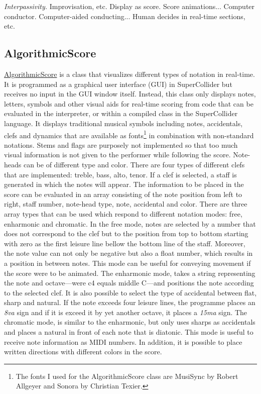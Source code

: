 \emph{Interpassivity.} Improvisation, etc.
Display as score. Score animations...
Computer conductor.
Computer-aided conducting... Human decides in real-time sections, etc.

\subsection{AlgorithmicScore}

\href{http://github.com/freuben/FedeLib/blob/master/AlgorithmicScore/AlgorithmicScore.sc}{AlgorithmicScore} is a class that visualizes different types of notation in real-time. It is programmed as a graphical user interface (GUI) in SuperCollider but receives no input in the GUI window itself. Instead, this class only displays notes, letters, symbols and other visual aids for real-time scoring from code that can be evaluated in the interpreter, or within a compiled class in the SuperCollider language. It displays traditional musical symbols including notes, accidentals, clefs and dynamics that are available as fonts\footnote{The fonts I used for the AlgorithmicScore class are MusiSync by Robert Allgeyer and Sonora by Christian Texier.} in combination with non-standard notations. Stems and flags are purposely not implemented so that too much visual information is not given to the performer while following the score. Note-heads can be of different type and color. There are four types of different clefs that are implemented: treble, bass, alto, tenor.  If a clef is selected, a staff is generated in which the notes will appear. The information to be placed in the score can be evaluated in an array consisting of the note position from left to right, staff number, note-head type, note, accidental and color. There are three array types that can be used which respond to different notation modes: free, enharmonic and chromatic. In the free mode, notes are selected by a number that does not correspond to the clef but to the position from top to bottom starting with zero as the first leisure line bellow the bottom line of the staff. Moreover, the note value can not only be negative but also a float number, which results in a position in between notes. This mode can be useful for conveying movement if the score were to be animated. The enharmonic mode, takes a string representing the note and octave---were c4 equals middle C---and positions the note according to the selected clef. It is also possible to select the type of accidental between flat, sharp and natural. If the note exceeds four leisure lines, the programme places an \emph{8va} sign and if it is exceed it by yet another octave, it places a \emph{15ma} sign. The chromatic mode, is similar to the enharmonic, but only uses sharps as accidentals and places a natural in front of each note that is diatonic. This mode is useful to receive note information as MIDI numbers. In addition, it is possible to place written directions with different colors in the score.

